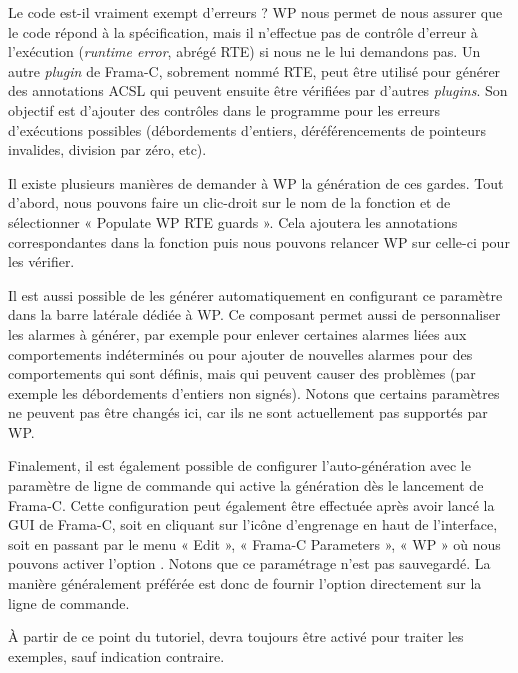 Le code est-il vraiment exempt d'erreurs ? WP nous permet de nous
assurer que le code répond à la spécification, mais il n'effectue pas de contrôle
d'erreur à l'exécution (\textit{runtime error}, abrégé RTE) si nous ne le lui
demandons pas. Un autre \textit{plugin} de Frama-C, sobrement nommé RTE, peut être
utilisé pour générer des annotations ACSL qui peuvent ensuite être vérifiées par
d'autres \textit{plugins}.
Son objectif est d'ajouter des contrôles dans le programme pour les erreurs d'exécutions
possibles (débordements d'entiers, déréférencements de pointeurs invalides,
division par zéro, etc).


Il existe plusieurs manières de demander à WP la génération de ces gardes. Tout
d'abord, nous pouvons faire un clic-droit sur le nom de la fonction et
de sélectionner « Populate WP RTE guards ». Cela ajoutera les annotations
correspondantes dans la fonction puis nous pouvons relancer WP sur celle-ci pour
les vérifier.




Il est aussi possible de les générer automatiquement en configurant ce paramètre
dans la barre latérale dédiée à WP. Ce composant permet aussi de personnaliser
les alarmes à générer, par exemple pour enlever certaines alarmes liées aux
comportements indéterminés ou pour ajouter de nouvelles alarmes pour des
comportements qui sont définis, mais qui peuvent causer des problèmes (par
exemple les débordements d'entiers non signés). Notons que certains paramètres
ne peuvent pas être changés ici, car ils ne sont actuellement pas supportés par
WP.




Finalement, il est également possible de configurer l'auto-génération avec le
paramètre de ligne de commande  qui active la génération
dès le lancement de Frama-C. Cette configuration peut également être effectuée
après avoir lancé la GUI de Frama-C, soit en cliquant sur l'icône d'engrenage
en haut de l'interface, soit en passant par le menu « Edit »,
« Frama-C Parameters », « WP »
où nous pouvons activer l'option . Notons que ce paramétrage
n'est pas sauvegardé. La manière généralement préférée est donc de fournir
l'option  directement sur la ligne de commande.


\begin{Information}
  À partir de ce point du tutoriel,  devra toujours être
  activé pour traiter les exemples, sauf indication contraire.
\end{Information}


